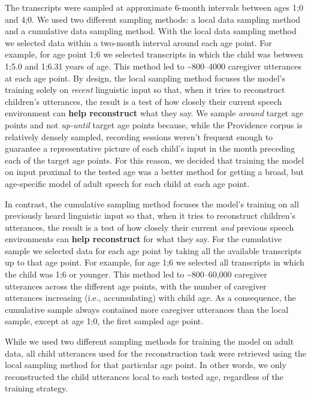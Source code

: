 \documentclass[
  english,
  man,mask,floatsintext]{apa6}
\begin{document}
The transcripts were sampled at approximate 6-month intervals between ages 1;0 and 4;0. We used two different sampling methods: a local data sampling method and a cumulative data sampling method. With the local data sampling method we selected data within a two-month interval around each age point. For example, for age point 1;6 we selected transcripts in which the child was between 1;5.0 and 1;6.31 years of age. This method led to \textasciitilde800--4000 caregiver utterances at each age point. By design, the local sampling method focuses the model's training solely on \emph{recent} linguistic input so that, when it tries to reconstruct children's utterances, the result is a test of how closely their current speech environment can \textbf{help reconstruct} what they say. We sample \emph{around} target age points and not \emph{up-until} target age points because, while the Providence corpus is relatively densely sampled, recording sessions weren't frequent enough to guarantee a representative picture of each child's input in the month preceding each of the target age points. For this reason, we decided that training the model on input proximal to the tested age was a better method for getting a broad, but age-specific model of adult speech for each child at each age point.

In contrast, the cumulative sampling method focuses the model's training on all previously heard linguistic input so that, when it tries to reconstruct children's utterances, the result is a test of how closely their current \emph{and} previous speech environments can \textbf{help reconstruct} for what they say. For the cumulative sample we selected data for each age point by taking all the available transcripts up to that age point. For example, for age 1;6 we selected all transcripts in which the child was 1;6 or younger. This method led to \textasciitilde800--60,000 caregiver utterances across the different age points, with the number of caregiver utterances increasing (i.e., accumulating) with child age. As a consequence, the cumulative sample always contained more caregiver utterances than the local sample, except at age 1;0, the first sampled age point.

While we used two different sampling methods for training the model on adult data, all child utterances used for the reconstruction task were retrieved using the local sampling method for that particular age point. In other words, we only reconstructed the child utterances local to each tested age, regardless of the training strategy.
\end{document}
